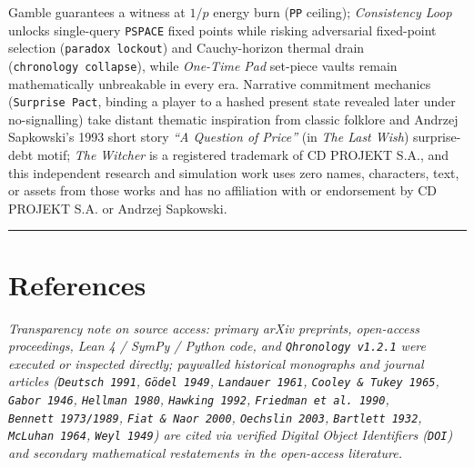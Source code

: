 \documentclass[10pt,letterpaper]{article}
\begin{document}
\begin{itemize}
{  Gamble} guarantees a witness at \(1/p\) energy burn (\texttt{PP}
  ceiling); \emph{Consistency Loop} unlocks single-query \texttt{PSPACE}
  fixed points while risking adversarial fixed-point selection
  (\texttt{paradox\ lockout}) and Cauchy-horizon thermal drain
  (\texttt{chronology\ collapse}), while \emph{One-Time Pad} set-piece
  vaults remain mathematically unbreakable in every era. Narrative
  commitment mechanics (\texttt{Surprise\ Pact}, binding a player to a
  hashed present state revealed later under no-signalling) take distant
  thematic inspiration from classic folklore and Andrzej Sapkowski's
  1993 short story \emph{``A Question of Price''} (in \emph{The Last
  Wish}) surprise-debt motif; \emph{The Witcher} is a registered
  trademark of CD PROJEKT S.A., and this independent research and
  simulation work uses zero names, characters, text, or assets from
  those works and has no affiliation with or endorsement by CD PROJEKT
  S.A. or Andrzej Sapkowski.
\end{itemize}

\begin{center}\rule{0.5\linewidth}{0.5pt}\end{center}

\section{References}\label{references}

\emph{Transparency note on source access: primary arXiv preprints,
open-access proceedings, Lean 4 / SymPy / Python code, and
\texttt{Qhronology\ v1.\allowbreak{}2.\allowbreak{}1} were executed or inspected directly;
paywalled historical monographs and journal articles
(\texttt{Deutsch\ 1991}, \texttt{Gödel\ 1949}, \texttt{Landauer\ 1961},
\texttt{Cooley\ \&\ Tukey\ 1965}, \texttt{Gabor\ 1946},
\texttt{Hellman\ 1980}, \texttt{Hawking\ 1992},
\texttt{Friedman\ et\ al.\allowbreak{}\ 1990}, \texttt{Bennett\ 1973/\allowbreak{}1989},
\texttt{Fiat\ \&\ Naor\ 2000}, \texttt{Oechslin\ 2003},
\texttt{Bartlett\ 1932}, \texttt{McLuhan\ 1964}, \texttt{Weyl\ 1949})
are cited via verified Digital Object Identifiers (\texttt{DOI}) and
secondary mathematical restatements in the open-access literature.}
\end{document}
